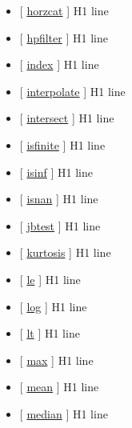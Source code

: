 \documentclass[letterpaper,10pt,english]{sphinxmanual}
\begin{document}
\begin{itemize}
\item {} 
{[} {\hyperref[classes/time_series/@ts/ts:horzcat]{horzcat}} {]}   H1 line

\item {} 
{[} {\hyperref[classes/time_series/@ts/ts:hpfilter]{hpfilter}} {]}   H1 line

\item {} 
{[} {\hyperref[classes/time_series/@ts/ts:index]{index}} {]}   H1 line

\item {} 
{[} {\hyperref[classes/time_series/@ts/ts:interpolate]{interpolate}} {]}   H1 line

\item {} 
{[} {\hyperref[classes/time_series/@ts/ts:intersect]{intersect}} {]}   H1 line

\item {} 
{[} {\hyperref[classes/time_series/@ts/ts:isfinite]{isfinite}} {]}   H1 line

\item {} 
{[} {\hyperref[classes/time_series/@ts/ts:isinf]{isinf}} {]}   H1 line

\item {} 
{[} {\hyperref[classes/time_series/@ts/ts:isnan]{isnan}} {]}   H1 line

\item {} 
{[} {\hyperref[classes/time_series/@ts/ts:jbtest]{jbtest}} {]}   H1 line

\item {} 
{[} {\hyperref[classes/time_series/@ts/ts:kurtosis]{kurtosis}} {]}   H1 line

\item {} 
{[} {\hyperref[classes/time_series/@ts/ts:le]{le}} {]}   H1 line

\item {} 
{[} {\hyperref[classes/time_series/@ts/ts:log]{log}} {]}   H1 line

\item {} 
{[} {\hyperref[classes/time_series/@ts/ts:lt]{lt}} {]}   H1 line

\item {} 
{[} {\hyperref[classes/time_series/@ts/ts:max]{max}} {]}   H1 line

\item {} 
{[} {\hyperref[classes/time_series/@ts/ts:mean]{mean}} {]}   H1 line

\item {} 
{[} {\hyperref[classes/time_series/@ts/ts:median]{median}} {]}   H1 line


\end{itemize}
\end{document}
